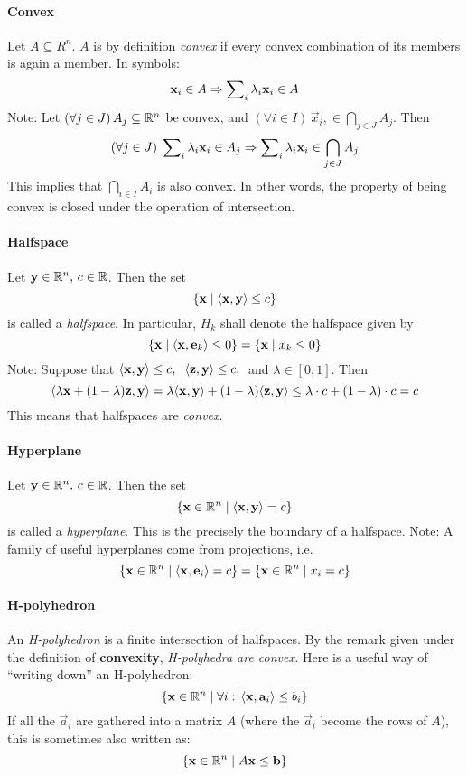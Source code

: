 \paragraph{Convex} 
Let $A \subseteq R^n$.  $A$ is by definition \textit{convex} if every convex combination of its members is again a member.  In symbols:
  \[\mathbf{x}_i \in A \Rightarrow
    \sum\nolimits_{i} \lambda_{i} \mathbf{x}_{i} \in A\]
Note: Let $(\forall j \in J) \, A_j \subseteq \mathbb{R}^n$ be convex, and $(\forall i\in I)\,\vec{x}_i, \in \bigcap_{j\in J}A_j$.  Then 
  \[(\forall j\in J)\; \sum\nolimits_{i} \lambda_{i} \mathbf{x}_{i} \in A_j \Rightarrow \sum\nolimits_{i} \lambda_{i} \mathbf{x}_{i} \in \bigcap_{j \in J} A_j\]  
 This implies that $\bigcap_{i \in I} A_i$ is also convex.  In other words, the property of being convex is closed under the operation of intersection.

\paragraph{Halfspace}
Let $\mathbf{y} \in \mathbb{R}^n,\, c \in \mathbb{R}$.  Then the set
  \[ \{\mathbf{x} \;|\; \langle \mathbf{x}, \mathbf{y} \rangle \leq c\} \]
is called a \textit{halfspace}.  In particular, $H_k$ shall denote the halfspace given by
  \[ \{\mathbf{x} \;|\; \langle \mathbf{x}, \mathbf{e}_k \rangle \leq 0 \} = 
     \{\mathbf{x} \;|\; x_k \leq 0 \} \]
Note:  Suppose that 
  $\langle \mathbf{x}, \mathbf{y} \rangle \leq c,\;$ 
  $\langle \mathbf{z}, \mathbf{y} \rangle \leq c,\;$ and
  $\lambda \in [0,1]$.  Then
  \[ \langle \lambda \mathbf{x} + (1-\lambda) \mathbf{z}, \mathbf{y} \rangle = 
    \lambda \langle \mathbf{x}, \mathbf{y} \rangle + (1-\lambda) \langle \mathbf{z}, \mathbf{y} \rangle \leq \lambda \cdot c + (1-\lambda) \cdot c = c
  \]
  This means that halfspaces are \textit{convex}.

\paragraph{Hyperplane}
Let $\mathbf{y} \in \mathbb{R}^n,\, c \in \mathbb{R}$.  Then the set
  \[ \{\mathbf{x} \in \mathbb{R}^n \;|\; \langle \mathbf{x}, \mathbf{y} \rangle = c\} \]
is called a \textit{hyperplane}.  This is the precisely the boundary of a halfspace.
Note:  A family of useful hyperplanes come from projections, i.e.
  \[ \{\mathbf{x} \in \mathbb{R}^n \;|\; \langle \mathbf{x}, \mathbf{e}_i \rangle = c\} = 
     \{\mathbf{x} \in \mathbb{R}^n \;|\; x_i = c\} \]

\paragraph{H-polyhedron}
An \textit{H-polyhedron} is a finite intersection of halfspaces.  By the remark given under the definition of \textbf{convexity}, \textit{H-polyhedra are convex.}  Here is a useful way of ``writing down'' an H-polyhedron:
  \[ \{ \mathbf{x} \in \mathbb{R}^n \;|\; 
    \forall i:\, \langle \mathbf{x}, \mathbf{a}_i \rangle \leq b_i \} \]
If all the $\vec{a}_i$ are gathered into a matrix $A$ (where the $\vec{a}_i$ become the rows of $A$), this is sometimes also written as:
  \[ \{ \mathbf{x} \in \mathbb{R}^n \;|\; A\mathbf{x} \leq \mathbf{b} \} \]


